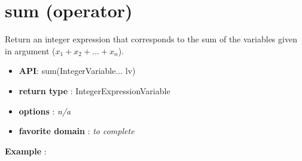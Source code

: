 \label{sum}
\hypertarget{sum}{}

\section{sum (operator)}\label{sum:sumoperator}\hypertarget{sum:sumoperator}{}
Return an integer expression that corresponds to the sum of the variables given in argument (\(x_1+x_2+...+x_n\)).

\begin{itemize}
	\item \textbf{API}: sum(IntegerVariable... lv)
	\item \textbf{return type} : IntegerExpressionVariable
	\item \textbf{options} : \emph{n/a}
	\item \textbf{favorite domain} : \emph{to complete}
\end{itemize}

\textbf{Example} :

